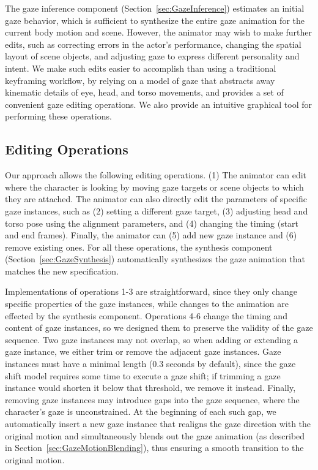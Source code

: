 The gaze inference component (Section~\ref{sec:GazeInference}) estimates an initial gaze behavior, which is sufficient to synthesize the entire gaze animation for the current body motion and scene. However, the animator may wish to make further edits, such as correcting errors in the actor's performance, changing the spatial layout of scene objects, and adjusting gaze to express different personality and intent. We make such edits easier to accomplish than using a traditional keyframing workflow, by relying on a model of gaze that abstracts away kinematic details of eye, head, and torso movements, and provides a set of convenient gaze editing operations. We also provide an intuitive graphical tool for performing these operations.

\subsection{Editing Operations}

Our approach allows the following editing operations. (1) The animator can edit where the character is looking by moving gaze targets or scene objects to which they are attached. The animator can also directly edit the parameters of specific gaze instances, such as (2) setting a different gaze target, (3) adjusting head and torso pose using the alignment parameters, and (4) changing the timing (start and end frames). Finally, the animator can (5) add new gaze instance and (6) remove existing ones. For all these operations, the synthesis component (Section~\ref{sec:GazeSynthesis}) automatically synthesizes the gaze animation that matches the new specification.

Implementations of operations 1-3 are straightforward, since they only change specific properties of the gaze instances, while changes to the animation are effected by the synthesis component. Operations 4-6 change the timing and content of gaze instances, so we designed them to preserve the validity of the gaze sequence. Two gaze instances may not overlap, so when adding or extending a gaze instance, we either trim or remove the adjacent gaze instances. Gaze instances must have a minimal length (0.3 seconds by default), since the gaze shift model requires some time to execute a gaze shift; if trimming a gaze instance would shorten it below that threshold, we remove it instead. Finally, removing gaze instances may introduce gaps into the gaze sequence, where the character's gaze is unconstrained. At the beginning of each such gap, we automatically insert a new gaze instance that realigns the gaze direction with the original motion and simultaneously blends out the gaze animation (as described in Section~\ref{sec:GazeMotionBlending}), thus ensuring a smooth transition to the original motion.


